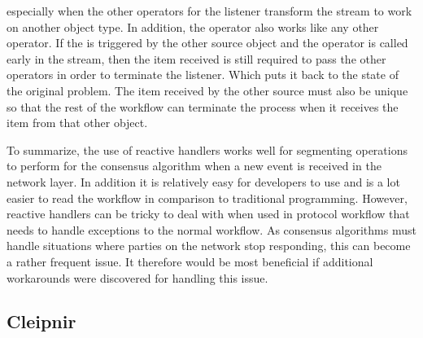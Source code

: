 especially when the other operators for the listener transform the stream to work on another object type. In addition, the  operator also works like any other operator. If the  is triggered by the other source object and the operator is called early in the stream, then the item received is still required to pass the other operators in order to terminate the listener. Which puts it back to the state of the original problem. The item received by the other source must also be unique so that the rest of the workflow can terminate the process when it receives the item from that other  object.

To summarize, the use of reactive handlers works well for segmenting operations to perform for the consensus algorithm when a new event is received in the network layer. In addition it is relatively easy for developers to use and is a lot easier to read the workflow in comparison to traditional programming. However, reactive handlers can be tricky to deal with when used in protocol workflow that needs to handle exceptions to the normal workflow. As consensus algorithms must handle situations where parties on the network stop responding, this can become a rather frequent issue. It therefore would be most beneficial if additional workarounds were discovered for handling this issue.  

\subsection{Cleipnir}
